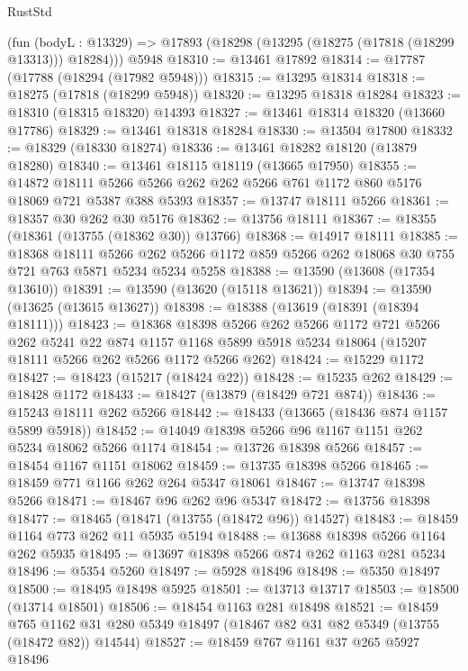 \begin{lexlean}{RustStd}
\begin{coremodule}
    (fun (bodyL : @13329) => @17893 (@18298 (@13295 (@18275 (@17818 (@18299 @13313))) @18284)))
    @5948
@18310 := @13461 @17892
@18314 := @17787 (@17788 (@18294 (@17982 @5948)))
@18315 := @13295 @18314
@18318 := @18275 (@17818 (@18299 @5948))
@18320 := @13295 @18318 @18284
@18323 := @18310 (@18315 @18320) @14393
@18327 := @13461 @18314 @18320 (@13660 @17786)
@18329 := @13461 @18318 @18284
@18330 := @13504 @17800
@18332 := @18329 (@18330 @18274)
@18336 := @13461 @18282 @18120 (@13879 @18280)
@18340 := @13461 @18115 @18119 (@13665 @17950)
@18355 := @14872
    @18111
    @5266
    @5266
    @262
    @262
    @5266
    @761
    @1172
    @860
    @5176
    @18069
    @721
    @5387
    @388
    @5393
@18357 := @13747 @18111 @5266
@18361 := @18357 @30 @262 @30 @5176
@18362 := @13756 @18111
@18367 := @18355 (@18361 (@13755 (@18362 @30)) @13766)
@18368 := @14917 @18111
@18385 := @18368
    @18111
    @5266
    @262
    @5266
    @1172
    @859
    @5266
    @262
    @18068
    @30
    @755
    @721
    @763
    @5871
    @5234
    @5234
    @5258
@18388 := @13590 (@13608 (@17354 @13610))
@18391 := @13590 (@13620 (@15118 @13621))
@18394 := @13590 (@13625 (@13615 @13627))
@18398 := @18388 (@13619 (@18391 (@18394 @18111)))
@18423 := @18368
    @18398
    @5266
    @262
    @5266
    @1172
    @721
    @5266
    @262
    @5241
    @22
    @874
    @1157
    @1168
    @5899
    @5918
    @5234
    @18064
    (@15207 @18111 @5266 @262 @5266 @1172 @5266 @262)
@18424 := @15229 @1172
@18427 := @18423 (@15217 (@18424 @22))
@18428 := @15235 @262
@18429 := @18428 @1172
@18433 := @18427 (@13879 (@18429 @721 @874))
@18436 := @15243 @18111 @262 @5266
@18442 := @18433 (@13665 (@18436 @874 @1157 @5899 @5918))
@18452 := @14049 @18398 @5266 @96 @1167 @1151 @262 @5234 @18062 @5266 @1174
@18454 := @13726 @18398 @5266
@18457 := @18454 @1167 @1151 @18062
@18459 := @13735 @18398 @5266
@18465 := @18459 @771 @1166 @262 @264 @5347 @18061
@18467 := @13747 @18398 @5266
@18471 := @18467 @96 @262 @96 @5347
@18472 := @13756 @18398
@18477 := @18465 (@18471 (@13755 (@18472 @96)) @14527)
@18483 := @18459 @1164 @773 @262 @11 @5935 @5194
@18488 := @13688 @18398 @5266 @1164 @262 @5935
@18495 := @13697 @18398 @5266 @874 @262 @1163 @281 @5234
@18496 := @5354 @5260
@18497 := @5928 @18496
@18498 := @5350 @18497
@18500 := @18495 @18498 @5925
@18501 := @13713 @13717
@18503 := @18500 (@13714 @18501)
@18506 := @18454 @1163 @281 @18498
@18521 := @18459
    @765
    @1162
    @31
    @280
    @5349
    @18497
    (@18467 @82 @31 @82 @5349 (@13755 (@18472 @82)) @14544)
@18527 := @18459 @767 @1161 @37 @265 @5927 @18496

\end{coremodule}
\end{lexlean}
